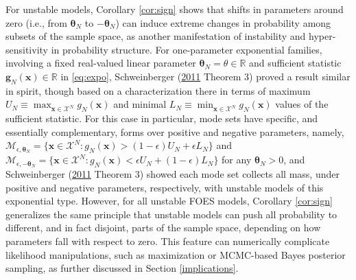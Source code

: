 \documentclass[]{article}
\theoremstyle{definition}
\begin{document}
For unstable models, Corollary \ref{cor:sign} shows that shifts in
parameters around zero (i.e., from \(\boldsymbol \theta_N\) to
\(-\boldsymbol \theta_N\)) can induce extreme changes in probability
among subsets of the sample space, as another manifestation of
instability and hyper-sensitivity in probability structure. For
one-parameter exponential families, involving a fixed real-valued linear
parameter \(\boldsymbol \theta_N = \theta \in \mathbb{R}\) and
sufficient statistic \(\boldsymbol g_N(\boldsymbol x)\in \mathbb{R}\) in
\eqref{eq:expo}, Schweinberger
(\protect\hyperlink{ref-schweinberger2011instability}{2011} Theorem 3)
proved a result similar in spirit, though based on a characterization
there in terms of maximum
\(U_N \equiv \max_{\boldsymbol x\in\mathcal{X}^N}g_N(\boldsymbol x)\)
and minimal
\(L_N \equiv \min_{\boldsymbol x\in\mathcal{X}^N}g_N(\boldsymbol x)\)
values of the sufficient statistic. For this case in particular, mode
sets have specific, and essentially complementary, forms over positive
and negative parameters, namely,
\(\mathcal{M}_{\epsilon, \boldsymbol \theta_N} = \{\boldsymbol x \in\mathcal{X}^N: g_N(\boldsymbol x) > (1-\epsilon) U_N + \epsilon L_N \}\)
and
\(\mathcal{M}_{\epsilon, -\boldsymbol \theta_N} = \{\boldsymbol x \in\mathcal{X}^N: g_N(\boldsymbol x) < \epsilon U_N + (1-\epsilon) L_N \}\)
for any \(\boldsymbol \theta_N>0\), and Schweinberger
(\protect\hyperlink{ref-schweinberger2011instability}{2011} Theorem 3)
showed each mode set collects all mass, under positive and negative
parameters, respectively, with unstable models of this exponential type.
However, for all unstable FOES models, Corollary \ref{cor:sign}
generalizes the same principle that unstable models can push all
probability to different, and in fact disjoint, parts of the sample
space, depending on how parameters fall with respect to zero. This
feature can numerically complicate likelihood manipulations, such as
maximization or MCMC-based Bayes posterior sampling, as further
discussed in Section \ref{implications}.
\end{document}
